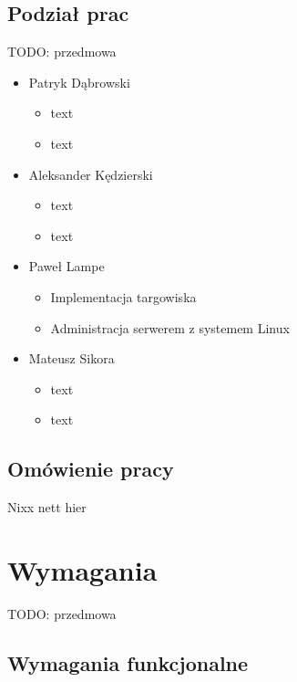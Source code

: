\documentclass[11pt,a4paper,polish,thesis]{dcsbook}
\begin{document}
\section{Podział prac}
TODO: przedmowa
\begin{itemize}
\item Patryk Dąbrowski
\begin{itemize}
\item text
\item text
\end{itemize}
\item Aleksander Kędzierski
\begin{itemize}
\item text
\item text
\end{itemize}
\item Paweł Lampe
\begin{itemize}
\item Implementacja targowiska
\item Administracja serwerem z systemem Linux
\end{itemize}
\item Mateusz Sikora
\begin{itemize}
\item text
\item text
\end{itemize}
\end{itemize}
\section{Omówienie pracy}
Nixx nett hier

\chapter{Wymagania}
TODO: przedmowa
\section{Wymagania funkcjonalne}
\end{document}
